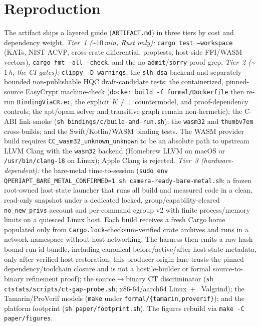 \documentclass[journal]{IEEEtran}
\newcommand{\code}[1]{\texttt{\small #1}}
\newcommand{\K}{\ensuremath{K}}
\begin{document}
\section{Reproduction}\label{app:repro}
The artifact ships a layered guide (\code{ARTIFACT.md}) in three tiers by cost and dependency weight.
\emph{Tier~1 (\textasciitilde$10$\,min, Rust only):} \code{cargo test --workspace} (KATs, NIST ACVP,
cross-crate differential, proptests, host-side FFI/WASM vectors), \code{cargo fmt --all --check}, and
the no-\code{admit}/\code{sorry} proof grep. \emph{Tier~2 (\textasciitilde$1$\,h, the CI gates):}
\code{clippy -D warnings}; the \code{slh-dsa} backend and separately bounded non-publishable HQC
draft-candidate tests; the containerized, pinned-source EasyCrypt machine-check
(\code{docker build -f formal/Dockerfile} then re-run \code{BindingViaCR.ec}, the explicit
$\K\neq\bot$ countermodel, and proof-dependency controls; the apt/opam solver and transitive graph
remain non-hermetic); the C-ABI link smoke (\code{sh bindings/c/build-and-run.sh});
the \code{wasm32} and \code{thumbv7em} cross-builds; and the Swift/Kotlin/WASM binding tests.
The WASM provider build requires
\code{CC\_wasm32\_unknown\_unknown} to be an absolute path to upstream LLVM Clang
with the \code{wasm32} backend (Homebrew LLVM on macOS or \code{/usr/bin/clang-18}
on Linux); Apple Clang is rejected.
\emph{Tier~3 (hardware-dependent):} the bare-metal time-to-session
(\code{sudo env QPERIAPT\_BARE\_METAL\_CONFIRMED=1 sh camera-ready-bare-metal.sh}; a frozen
root-owned host-state launcher that runs all build and measured code in a clean, read-only snapshot
under a dedicated locked, group/capability-cleared \code{no\_new\_privs} account and per-command
cgroup v2 with finite process/memory limits on a quiesced Linux host. Each build receives a fresh
Cargo home populated only from \code{Cargo.lock}-checksum-verified crate archives and runs in a
network namespace without host networking. The harness then emits a raw hash-bound run-id bundle,
including canonical before/active/after host-state metadata, only after verified host restoration;
this producer-origin lane trusts the pinned dependency/toolchain closure and is not a hostile-builder
or formal source-to-binary refinement proof);
the
source$\to$binary CT discriminator (\code{sh ctstats/scripts/ct-gap-probe.sh}; x86-64/aarch64 Linux~+~
Valgrind); the Tamarin/ProVerif models (\code{make} under \code{formal/\{tamarin,proverif\}}); and the
platform footprint (\code{sh paper/footprint.sh}). The figures rebuild via \code{make -C paper/figures}.
\end{document}
